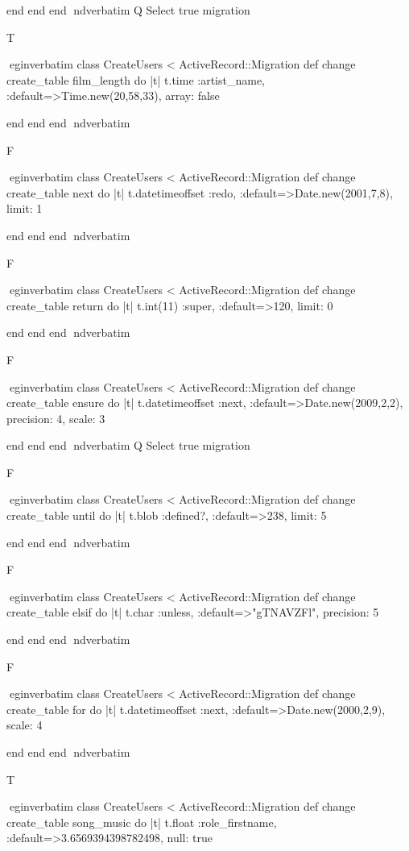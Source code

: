     end 
  end 
end
nd{verbatim}
Q
 Select true migration

T

egin{verbatim}
 class CreateUsers < ActiveRecord::Migration 
  def change 
    create_table film_length do |t| 
      t.time :artist_name, :default=>Time.new(20,58,33), array: false
    
    end 
  end 
end
nd{verbatim}

F

egin{verbatim}
 class CreateUsers < ActiveRecord::Migration 
  def change 
    create_table next do |t| 
      t.datetimeoffset :redo, :default=>Date.new(2001,7,8), limit: 1
    
    end 
  end 
end
nd{verbatim}

F

egin{verbatim}
 class CreateUsers < ActiveRecord::Migration 
  def change 
    create_table return do |t| 
      t.int(11) :super, :default=>120, limit: 0
    
    end 
  end 
end
nd{verbatim}

F

egin{verbatim}
 class CreateUsers < ActiveRecord::Migration 
  def change 
    create_table ensure do |t| 
      t.datetimeoffset :next, :default=>Date.new(2009,2,2), precision: 4, scale: 3
    
    end 
  end 
end
nd{verbatim}
Q
 Select true migration

F

egin{verbatim}
 class CreateUsers < ActiveRecord::Migration 
  def change 
    create_table until do |t| 
      t.blob :defined?, :default=>238, limit: 5
    
    end 
  end 
end
nd{verbatim}

F

egin{verbatim}
 class CreateUsers < ActiveRecord::Migration 
  def change 
    create_table elsif do |t| 
      t.char :unless, :default=>"gTNAVZFl", precision: 5
    
    end 
  end 
end
nd{verbatim}

F

egin{verbatim}
 class CreateUsers < ActiveRecord::Migration 
  def change 
    create_table for do |t| 
      t.datetimeoffset :next, :default=>Date.new(2000,2,9), scale: 4
    
    end 
  end 
end
nd{verbatim}

T

egin{verbatim}
 class CreateUsers < ActiveRecord::Migration 
  def change 
    create_table song_music do |t| 
      t.float :role_firstname, :default=>3.6569394398782498, null: true
    
